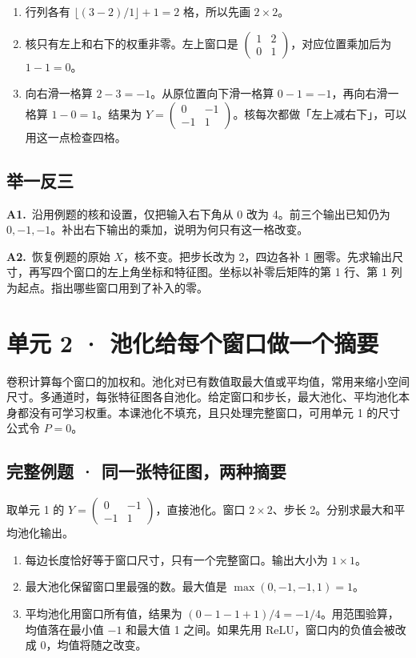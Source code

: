 \documentclass[UTF8,a4paper,11pt]{ctexart}
\newcommand{\CompactQuestion}[2]{\par\noindent\textbf{#1.}\ #2\par\vspace{.8em}}
\begin{document}
\begin{enumerate}
\item 行列各有 $\lfloor(3-2)/1\rfloor+1=2$ 格，所以先画 $2\times2$。
\item 核只有左上和右下的权重非零。左上窗口是 $\begin{pmatrix}1&2\\0&1\end{pmatrix}$，对应位置乘加后为 $1-1=0$。
\item 向右滑一格算 $2-3=-1$。从原位置向下滑一格算 $0-1=-1$，再向右滑一格算 $1-0=1$。结果为 $Y=\begin{pmatrix}0&-1\\-1&1\end{pmatrix}$。核每次都做「左上减右下」，可以用这一点检查四格。
\end{enumerate}
\subsection{举一反三}
\CompactQuestion{A1}{沿用例题的核和设置，仅把输入右下角从 0 改为 4。前三个输出已知仍为 $0,-1,-1$。补出右下输出的乘加，说明为何只有这一格改变。}
\CompactQuestion{A2}{恢复例题的原始 $X$，核不变。把步长改为 2，四边各补 1 圈零。先求输出尺寸，再写四个窗口的左上角坐标和特征图。坐标以补零后矩阵的第 1 行、第 1 列为起点。指出哪些窗口用到了补入的零。}
\clearpage
\section{单元 2 · 池化给每个窗口做一个摘要}
卷积计算每个窗口的加权和。池化对已有数值取最大值或平均值，常用来缩小空间尺寸。多通道时，每张特征图各自池化。给定窗口和步长，最大池化、平均池化本身都没有可学习权重。本课池化不填充，且只处理完整窗口，可用单元 1 的尺寸公式令 $P=0$。

\subsection{完整例题 · 同一张特征图，两种摘要}
取单元 1 的 $Y=\begin{pmatrix}0&-1\\-1&1\end{pmatrix}$，直接池化。窗口 $2\times2$、步长 2。分别求最大和平均池化输出。

\begin{enumerate}
\item 每边长度恰好等于窗口尺寸，只有一个完整窗口。输出大小为 $1\times1$。
\item 最大池化保留窗口里最强的数。最大值是 $\max(0,-1,-1,1)=1$。
\item 平均池化用窗口所有值，结果为 $(0-1-1+1)/4=-1/4$。用范围验算，均值落在最小值 $-1$ 和最大值 1 之间。如果先用 ReLU，窗口内的负值会被改成 0，均值将随之改变。
\end{enumerate}
\end{document}
